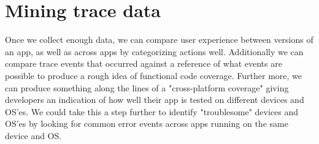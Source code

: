 
\section{Mining trace data}
Once we collect enough data, we can compare user experience between versions
of an app, as well as across apps by categorizing actions well. Additionally
we can compare trace events that occurred against a reference of what events
are possible to produce a rough idea of functional code coverage. Further
more, we can produce something along the lines of a "cross-platform coverage"
giving developers an indication of how well their app is tested on different
devices and OS'es. We could take this a step further to identify "troublesome"
devices and OS'es by looking for common error events across apps running on the
same device and OS.
